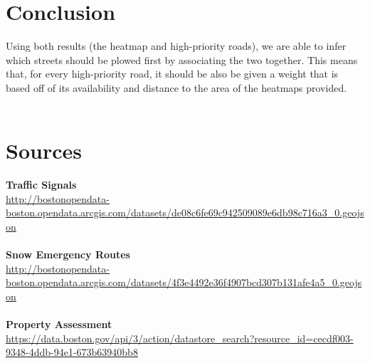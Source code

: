 \documentclass[15pt]{report}
\begin{document}
\section*{Conclusion}
Using both results (the heatmap and high-priority roads), we are able to infer which streets should be plowed first by associating the two together. This means that, for every high-priority road, it should be also be given a weight that is based off of its availability and distance to the area of the heatmaps provided. \\\\
\pagebreak
\section*{Sources}
\sloppy 
\textbf{Traffic Signals} \\
\url{http://bostonopendata-boston.opendata.arcgis.com/datasets/de08c6fe69c942509089e6db98c716a3_0.geojson} \\\\
\textbf{Snow Emergency Routes} \\
\url{http://bostonopendata-boston.opendata.arcgis.com/datasets/4f3e4492e36f4907bcd307b131afe4a5_0.geojson} \\\\
\textbf{Property Assessment} \\
\url{https://data.boston.gov/api/3/action/datastore_search?resource_id=cecdf003-9348-4ddb-94e1-673b63940bb8}
\end{document}
